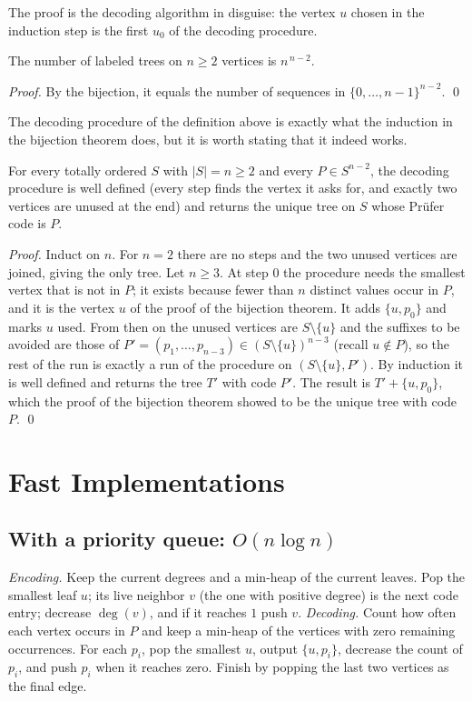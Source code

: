 \documentclass[11pt]{article}
\begin{document}
The proof is the decoding algorithm in disguise: the vertex $u$ chosen in
the induction step is the first $u_0$ of the decoding procedure.

\begin{theorembox}
The number of labeled trees on $n\ge2$ vertices is $n^{\,n-2}$.

\emph{Proof.} By the bijection, it equals the number of sequences in
$\{0,\dots,n-1\}^{n-2}$. \qed
\end{theorembox}

The decoding procedure of the definition above is exactly what the
induction in the bijection theorem does, but it is worth stating that it
indeed works.

\begin{theorembox}
For every totally ordered $S$ with $|S|=n\ge2$ and every $P\in S^{n-2}$,
the decoding procedure is well defined (every step finds the vertex it
asks for, and exactly two vertices are unused at the end) and returns the
unique tree on $S$ whose Pr\"ufer code is $P$.

\emph{Proof.} Induct on $n$. For $n=2$ there are no steps and the two
unused vertices are joined, giving the only tree. Let $n\ge3$. At step $0$
the procedure needs the smallest vertex that is not in $P$; it exists
because fewer than $n$ distinct values occur in $P$, and it is the vertex
$u$ of the proof of the bijection theorem. It adds $\{u,p_0\}$ and marks
$u$ used. From then on the unused vertices are $S\setminus\{u\}$ and the
suffixes to be avoided are those of $P'=(p_1,\dots,p_{n-3})\in
(S\setminus\{u\})^{n-3}$ (recall $u\notin P$), so the rest of the run is
exactly a run of the procedure on $(S\setminus\{u\},P')$. By induction it
is well defined and returns the tree $T'$ with code $P'$. The result is
$T'+\{u,p_0\}$, which the proof of the bijection theorem showed to be the
unique tree with code $P$. \qed
\end{theorembox}

\section{Fast Implementations}
\subsection{With a priority queue: \texorpdfstring{$O(n\log n)$}{O(n log n)}}
\emph{Encoding.} Keep the current degrees and a min-heap of the current
leaves. Pop the smallest leaf $u$; its live neighbor $v$ (the one with
positive degree) is the next code entry; decrease $\deg(v)$, and if it
reaches $1$ push $v$. \emph{Decoding.} Count how often each vertex occurs
in $P$ and keep a min-heap of the vertices with zero remaining occurrences.
For each $p_i$, pop the smallest $u$, output $\{u,p_i\}$, decrease the
count of $p_i$, and push $p_i$ when it reaches zero. Finish by popping the
last two vertices as the final edge.
\end{document}
